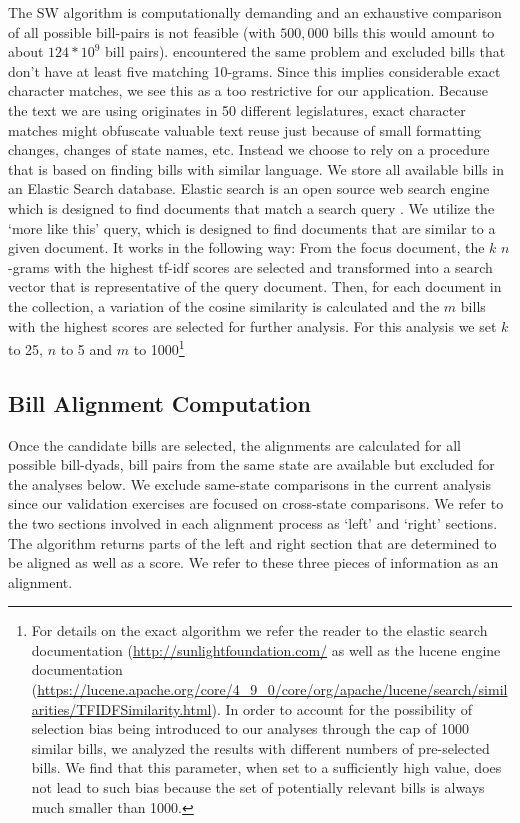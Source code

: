 \documentclass[12pt]{article} %
\begin{document}
The SW algorithm is computationally demanding and an exhaustive comparison of
all possible bill-pairs is not feasible (with $500,000$ bills this would amount
to about $124 * 10^9$ bill pairs). \citet{wilkerson2015tracing} encountered the same problem and excluded bills that don't have at least five matching 10-grams. Since this implies considerable exact character matches, we see this as a too restrictive for our application. Because the text we are using originates in 50 different legislatures, exact character matches might obfuscate valuable text reuse just because of small formatting changes, changes of state names, etc. 
Instead we choose to rely on a procedure that is based on finding bills with
similar language. We store all available bills in an Elastic Search database.
Elastic search is an open source web search engine which is designed to find
documents that match a search query \citep{gormley2015elasticsearch}. We utilize
the `more like this' query, which is designed to find documents that are similar
to a given document. It works in the following way: From the focus document, the
$k$ $n$-grams with the highest tf-idf scores are selected and transformed into a
search vector that is representative of the query document. Then, for each
document in the collection, a variation of the cosine similarity is calculated
and the $m$ bills with the highest scores are selected for further analysis. For
this analysis we set $k$ to 25, $n$ to 5 and $m$ to 1000\footnote{For
details on the exact algorithm we refer the reader to the elastic search
documentation (\url{http://sunlightfoundation.com/} as well as the lucene engine
documentation
(\url{https://lucene.apache.org/core/4_9_0/core/org/apache/lucene/search/similarities/TFIDFSimilarity.html}).
In order to account for the possibility of selection bias being introduced to
our analyses through the cap of 1000 similar bills, we analyzed the results with
different numbers of pre-selected bills. We find that this parameter, when set
to a sufficiently high value, does not lead to such bias because the set of
potentially relevant bills is always much smaller than 1000.}


\subsection{Bill Alignment Computation}

Once the candidate bills are selected, the alignments are calculated for all
possible bill-dyads, bill pairs from the same state are available but excluded
for the analyses below. We exclude same-state comparisons in the current analysis since our validation exercises are focused on cross-state comparisons. We refer to the two sections involved in each alignment process as `left' and `right' sections. The algorithm returns parts of the left and right section that are determined to be aligned as well as a score. We refer to these three pieces of information as an alignment. 
\end{document}
